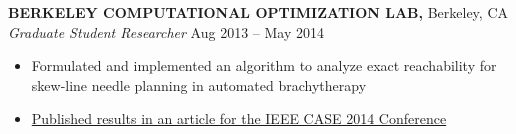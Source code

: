 \documentclass[geomargin]{res}
\begin{document}
\begin{resume}
{\bf BERKELEY COMPUTATIONAL OPTIMIZATION LAB,} Berkeley, CA \\
{\em Graduate Student Researcher} \hfill
Aug 2013 -- May 2014 \\                                          \vspace{-4mm}
\begin{itemize}                                         \itemsep1pt %
        \item    Formulated and implemented an algorithm to analyze exact reachability for skew-line needle planning in automated brachytherapy
        \item    \href{http://ieeexplore.ieee.org/abstract/document/6899376/}{Published results in an article for the IEEE CASE 2014 Conference}
\end{itemize}
\vspace{-1mm}





\end{resume}
\end{document}
